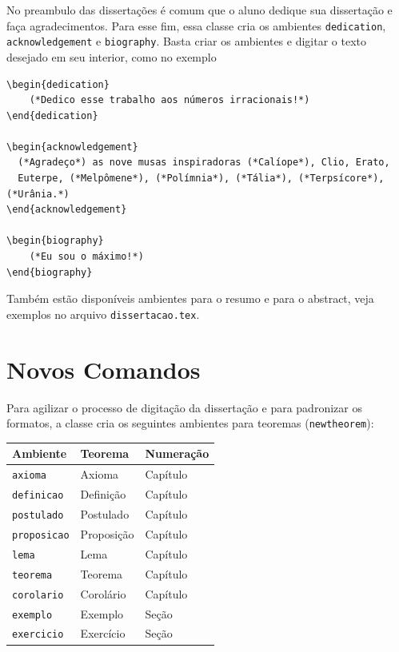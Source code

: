 \documentclass[fleqn]{profmat-cefet}
\newcommand{\texfile}  {\texttt{dissertacao.tex}}
\begin{document}
No preambulo das dissertações é comum que o aluno dedique sua dissertação e faça
agradecimentos. Para esse fim, essa classe cria os ambientes 
\lstinline!dedication!, 
\lstinline!acknowledgement! e
\lstinline!biography!.
Basta criar os ambientes e digitar o texto desejado em seu interior,
como no exemplo
\begin{lstlisting}
\begin{dedication} 
    (*Dedico esse trabalho aos números irracionais!*)
\end{dedication}

\begin{acknowledgement} 
  (*Agradeço*) as nove musas inspiradoras (*Calíope*), Clio, Erato, 
  Euterpe, (*Melpômene*), (*Polímnia*), (*Tália*), (*Terpsícore*), (*Urânia.*)
\end{acknowledgement}

\begin{biography} 
    (*Eu sou o máximo!*)
\end{biography}
\end{lstlisting}

Também estão disponíveis ambientes para o resumo e para o abstract, 
veja exemplos no arquivo \texfile{}.

\section{Novos Comandos}
\label{sec:novos_comandos}

Para agilizar o processo de digitação da dissertação e para padronizar os
formatos, a classe cria os seguintes ambientes para teoremas
(\lstinline!newtheorem!):
\begin{center}
    \begin{tabular}{lll}
            \hline
            Ambiente               & Teorema    & Numeração \\ \hline
            \lstinline!axioma!     & Axioma     & Capítulo  \\
            \lstinline!definicao!  & Definição  & Capítulo  \\
            \lstinline!postulado!  & Postulado  & Capítulo  \\
            \lstinline!proposicao! & Proposição & Capítulo  \\
            \lstinline!lema!       & Lema       & Capítulo  \\
            \lstinline!teorema!    & Teorema    & Capítulo  \\
            \lstinline!corolario!  & Corolário  & Capítulo  \\
            \lstinline!exemplo!    & Exemplo    & Seção     \\
            \lstinline!exercicio!  & Exercício  & Seção     \\ \hline
    \end{tabular}
\end{center}
\end{document}
